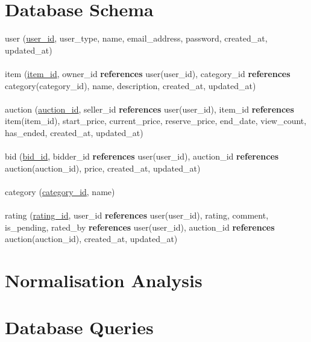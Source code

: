 \documentclass{article}
\begin{document}
\section{Database Schema}

user (\underline{user\_id}, user\_type, name, email\_address, password, created\_at, updated\_at)\\
\\
item (\underline{item\_id}, owner\_id \textbf{references} user(user\_id), category\_id \textbf{references} category(category\_id), name, description, created\_at, updated\_at)\\
\\
auction (\underline{auction\_id}, seller\_id \textbf{references} user(user\_id), item\_id \textbf{references} item(item\_id), start\_price, current\_price, reserve\_price, end\_date, view\_count, has\_ended, created\_at, updated\_at)\\
\\
bid (\underline{bid\_id}, bidder\_id \textbf{references} user(user\_id), auction\_id \textbf{references} auction(auction\_id), price, created\_at, updated\_at)\\
\\
category (\underline{category\_id}, name)\\
\\
rating (\underline{rating\_id}, user\_id \textbf{references} user(user\_id), rating, comment, is\_pending, rated\_by \textbf{references} user(user\_id), auction\_id \textbf{references} auction(auction\_id), created\_at, updated\_at)

\section{Normalisation Analysis}

\section{Database Queries}

\end{document}
